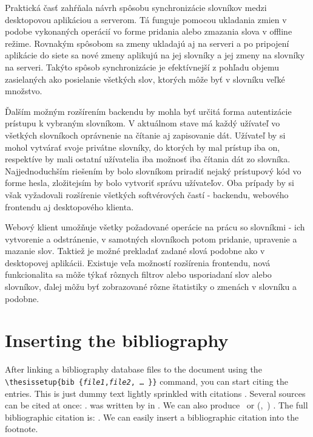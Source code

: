 \documentclass[
  digital, %
  table,   %
  lof,     %
  lot,     %
]{fithesis3}
\begin{document}
Praktická časť zahŕňala návrh spôsobu synchronizácie slovníkov medzi desktopovou aplikáciou a serverom. Tá funguje pomocou ukladania zmien v podobe vykonaných operácií vo forme pridania alebo zmazania slova v offline režime. Rovnakým spôsobom sa zmeny ukladajú aj na serveri a po pripojení aplikácie do siete sa nové zmeny aplikujú na jej slovníky a jej zmeny na slovníky na serveri. Takýto spôsob synchronizácie je efektívnejší z pohľadu objemu zasielaných ako posielanie všetkých slov, ktorých môže byť v slovníku veľké množstvo.

Ďalším možným rozšírením backendu by mohla byť určitá forma autentizácie prístupu k vybraným slovníkom. V aktuálnom stave má každý užívateľ vo všetkých slovníkoch oprávnenie na čítanie aj zapisovanie dát. Užívateľ by si mohol vytvárať svoje privátne slovníky, do ktorých by mal prístup iba on, respektíve by mali ostatní užívatelia iba možnosť iba čítania dát zo slovníka. Najjednoduchším riešením by bolo slovníkom priradiť nejaký prístupový kód vo forme hesla, zložitejsím by bolo vytvoriť správu užívateľov. Oba prípady by si však vyžadovali rozšírenie všetkých softvérových častí - backendu, webového frontendu aj desktopového klienta.

Webový klient umožňuje všetky požadované operácie na prácu so slovníkmi - ich vytvorenie a odstránenie, v samotných slovníkoch potom pridanie, upravenie a mazanie slov. Taktiež je možné prekladať zadané slová podobne ako v desktopovej aplikácii. Existuje veľa možností rozšírenia frontendu, nová funkcionalita sa môže týkať rôznych filtrov alebo usporiadaní slov alebo slovníkov, ďalej môžu byť zobrazované rôzne štatistiky o zmenách v slovníku a podobne.


\chapter{Inserting the bibliography}
After linking a bibliography data\-base files to the document using
the \verb"\"\texttt{thesissetup\{bib\discretionary{=}{=}{=}%
\{\textit{file1},\textit{file2},\,\ldots\,\}\}} command, you can
start citing the entries. This is just dummy text
\parencite{borgman03} lightly sprinkled with citations
\parencite[p.~123]{greenberg98}. Several sources can be cited at
once: \cite{borgman03,greenberg98,thanh01}.
 was written by \citeauthor{greenberg98} in
\citeyear{greenberg98}. We can also produce \textcite{greenberg98}%
\ or %
\def\citeauthoryear#1{(\textcite{#1},~\citeyear{#1})}%
\citeauthoryear{greenberg98}%
. The full bibliographic citation is:
\emph{}. We can easily insert a bibliographic
citation into the footnote.
\end{document}
